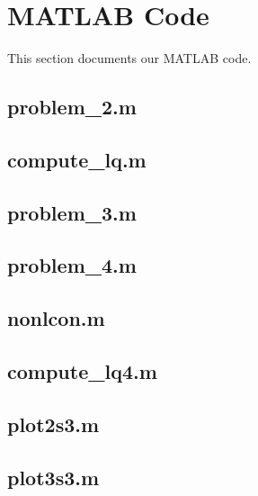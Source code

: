 \appendix

\section{MATLAB Code}\label{sec:matlab}
This section documents our MATLAB code.

\subsection{problem\_2.m}

\subsection{compute\_lq.m}


\subsection{problem\_3.m}

\subsection{problem\_4.m}

\subsection{nonlcon.m}

\subsection{compute\_lq4.m}


\subsection{plot2s3.m}

\subsection{plot3s3.m}

